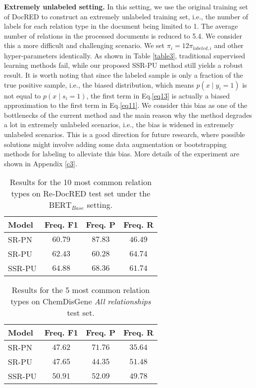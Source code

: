 \documentclass[11pt]{article}
\begin{document}
\textbf{Extremely unlabeled setting.} \enspace In this setting, we use the original training set of DocRED to construct an extremely unlabeled training set, i.e., the number of labels for each relation type in the document being limited to 1. The average number of relations in the processed documents is reduced to 5.4. We consider this a more difficult and challenging scenario. We set $\pi_{i}=12\pi_{labeled,i}$ and other hyper-parameters identically. As shown in Table \ref{table3}, traditional supervised learning methods fail, while our proposed SSR-PU method still yields a robust result. It is worth noting that since the labeled sample is only a fraction of the true positive sample, i.e., the biased distribution, which means $p(x \mid y_{i}=1)$ is not equal to $p(x \mid s_{i}=1)$, the first term in Eq.\ref{eq13} is actually a biased approximation to the first term in Eq.\ref{eq11}. We consider this bias as one of the bottlenecks of the current method and the main reason why the method degrades a lot in extremely unlabeled scenarios, i.e., the bias is widened in extremely unlabeled scenarios. This is a good direction for future research, where possible solutions might involve adding some data augmentation or bootstrapping methods for labeling to alleviate this bias. More details of the experiment are shown in Appendix \ref{c3}.

\begin{table}
\centering
\begin{tabular}{lccc}
\hline \textbf{Model} & \textbf{Freq. F1} & \textbf{Freq. P} & \textbf{Freq. R} \\
\hline
SR-PN & $60.79$ & $87.83$ & $46.49$ \\
SR-PU & $62.43$ & $60.28$ & $64.74$ \\
SSR-PU & $64.88$ & $68.36$ & $61.74$ \\
\hline
\end{tabular}
\caption{\label{table_common1}
Results for the 10 most common relation types on Re-DocRED test set under the $\mathrm{BERT}_{Base}$ setting.
}
\end{table}

\begin{table}
\centering
\begin{tabular}{lccc}
\hline \textbf{Model} & \textbf{Freq. F1} & \textbf{Freq. P} & \textbf{Freq. R} \\
\hline
SR-PN & $47.62$ & $71.76$ & $35.64$ \\
SR-PU & $47.65$ & $44.35$ & $51.48$ \\
SSR-PU & $50.91$ & $52.09$ & $49.78$ \\
\hline
\end{tabular}
\caption{\label{table_common2}
Results for the 5 most common relation types on ChemDisGene \emph{All relationships} test set. 
}
\end{table}
\end{document}
